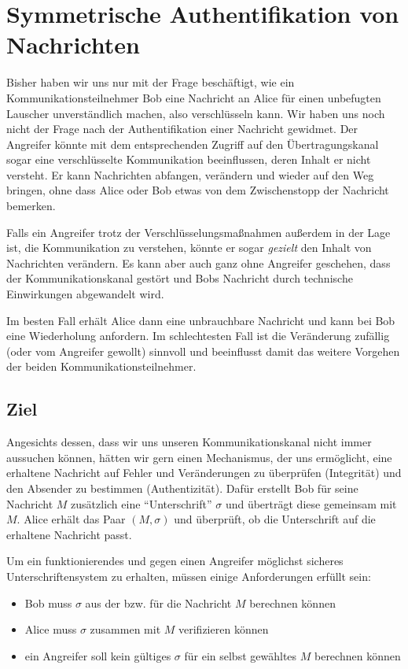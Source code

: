 \chapter{Symmetrische Authentifikation von Nachrichten}
\label{cha6}

Bisher haben wir uns nur mit der Frage beschäftigt, wie ein Kommunikationsteilnehmer Bob eine Nachricht an Alice für einen unbefugten Lauscher unverständlich
machen, also verschlüsseln kann. Wir haben uns noch nicht der Frage nach der Authentifikation einer Nachricht gewidmet. Der Angreifer könnte mit dem
entsprechenden Zugriff auf den Übertragungskanal sogar eine verschlüsselte Kommunikation beeinflussen, deren Inhalt er nicht versteht. Er kann Nachrichten
abfangen, verändern und wieder auf den Weg bringen, ohne dass Alice oder Bob etwas von dem Zwischenstopp der Nachricht bemerken.

Falls ein Angreifer trotz der Verschlüsselungsmaßnahmen außerdem in der Lage ist, die Kommunikation zu verstehen, könnte er sogar \textit{gezielt} den Inhalt
von Nachrichten verändern. Es kann aber auch ganz ohne Angreifer geschehen, dass der Kommunikationskanal gestört und Bobs Nachricht durch technische Einwirkungen
abgewandelt wird.

Im besten Fall erhält Alice dann eine unbrauchbare Nachricht und kann bei Bob eine Wiederholung anfordern. Im schlechtesten Fall ist die Veränderung zufällig
(oder vom Angreifer gewollt) sinnvoll und beeinflusst damit das weitere Vorgehen der beiden Kommunikationsteilnehmer.

\section{Ziel}
Angesichts dessen, dass wir uns unseren Kommunikationskanal nicht immer aussuchen können, hätten wir gern einen Mechanismus, der uns ermöglicht, eine erhaltene
Nachricht auf Fehler und Veränderungen zu überprüfen (Integrität) und den Absender zu bestimmen (Authentizität). Dafür erstellt Bob für seine Nachricht $M$
zusätzlich eine "`Unterschrift"' $\sigma$ und überträgt diese gemeinsam mit $M$. Alice erhält das Paar $(M,\sigma)$ und überprüft, ob die Unterschrift auf die
erhaltene Nachricht passt.

Um ein funktionierendes und gegen einen Angreifer möglichst sicheres Unterschriftensystem zu erhalten, müssen einige Anforderungen erfüllt sein:
\begin{itemize}
  \item Bob muss $\sigma$ aus der bzw. für die Nachricht $M$ berechnen können
  \item Alice muss $\sigma$ zusammen mit $M$ verifizieren können
  \item ein Angreifer soll kein gültiges $\sigma$ für ein selbst gewähltes $M$ berechnen können
\end{itemize} 

